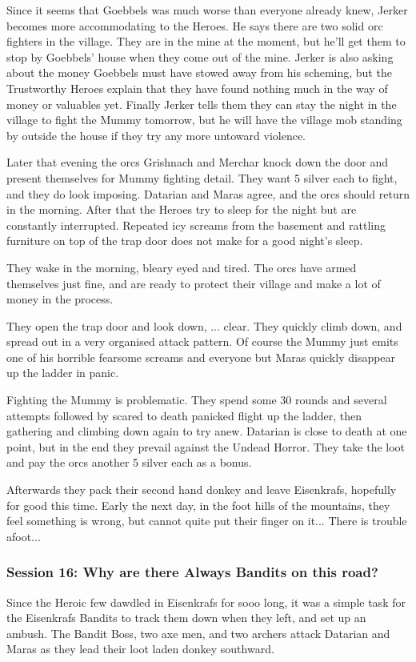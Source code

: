 Since it seems that Goebbels was much worse than everyone already knew, Jerker becomes more accommodating to the Heroes. He says there are two solid orc fighters in the village. They are in the mine at the moment, but he'll get them to stop by Goebbels' house when they come out of the mine. Jerker is also asking about the money Goebbels must have stowed away from his scheming, but the Trustworthy Heroes explain that they have found nothing much in the way of money or valuables yet.
Finally Jerker tells them they can stay the night in the village to fight the Mummy tomorrow, but he will have the village mob standing by outside the house if they try any more untoward violence.

Later that evening the orcs Grishnach and Merchar knock down the door and present themselves for Mummy fighting detail. They want 5 silver each to fight, and they do look imposing. Datarian and Maras agree, and the orcs should return in the morning. After that the Heroes try to sleep for the night but are constantly interrupted. Repeated icy screams from the basement and rattling furniture on top of the trap door does not make for a good night's sleep.

They wake in the morning, bleary eyed and tired. The orcs have armed themselves just fine, and are ready to protect their village and make a lot of money in the process.

They open the trap door and look down, ... clear. They quickly climb down, and spread out in a very organised attack pattern. Of course the Mummy just emits one of his horrible fearsome screams and everyone but Maras quickly disappear up the ladder in panic.

Fighting the Mummy is problematic. They spend some 30 rounds and several attempts followed by scared to death panicked flight up the ladder, then gathering and climbing down again to try anew. Datarian is close to death at one point, but in the end they prevail against the Undead Horror. They take the loot and pay the orcs another 5 silver each as a bonus.

Afterwards they pack their second hand donkey and leave Eisenkrafs, hopefully for good this time. Early the next day, in the foot hills of the mountains, they feel something is wrong, but cannot quite put their finger on it... There is trouble afoot...


\subsubsection*{Session 16: Why are there Always Bandits on this road?}
Since the Heroic few dawdled in Eisenkrafs for sooo long, it was a simple task for the Eisenkrafs Bandits to track them down when they left, and set up an ambush.
The Bandit Boss, two axe men, and two archers attack Datarian and Maras as they lead their loot laden donkey southward.

